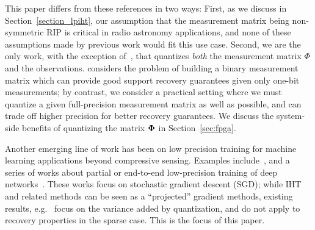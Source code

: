 \documentclass{article}
\begin{document}
{This paper differs from these references
in two ways: First, as we discuss in Section~\ref{section_lpiht},
our assumption that the measurement matrix being
non-symmetric RIP is critical in radio astronomy applications, 
and none of these assumptions made by previous work would fit  this use case. Second, we are the only work,
with the exception of~\cite{gopi20131bitcs}, that quantizes
{\em both} the measurement matrix $\Phi$ and the observations.
\cite{gopi20131bitcs} considers the problem of building a  binary measurement matrix which can provide good support recovery guarantees given only one-bit measurements; by contrast, we consider a practical setting where we must quantize a given full-precision measurement matrix as well as possible, and can trade off higher precision for better recovery guarantees. 
We discuss the system-side benefits  
of quantizing the matrix ${\bf \Phi}$ in Section~\ref{sec:fpga}. 

} 



Another emerging line of work has been on low precision training for 
machine learning applications beyond compressive
sensing. Examples include~\cite{desa2015hogwild, alistarh2016qsgd, zhang2017zipml}, and
a series of works about 
partial or end-to-end low-precision training 
of deep networks~\cite{seide2014sgd1bit, hubara2016qsnn, rastegari2016binarycnn,zhou2016cnn, miyashita2016cnn, li2016twn, gupta2015dl}.
These works focus on stochastic gradient descent (SGD); while IHT and related methods can be seen as a ``projected'' gradient methods, existing results, e.g.~\cite{zhang2017zipml} focus on the variance added by quantization, and do not apply to recovery properties in the sparse case. This is the focus of this paper. 


\end{document}
